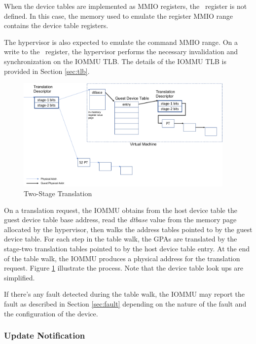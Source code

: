 When the device tables are implemented as MMIO registers, the \dtbase\ register is not
defined. In this case, the memory used to emulate the register MMIO range contains the
device table registers.

The hypervisor is also expected to emulate the command MMIO range. On a write to the
\invltlb\ register, the hypervisor performs the necessary invalidation and
synchronization on the IOMMU TLB. The details of the IOMMU TLB is provided in Section
\ref{sec:tlb}.

\begin{figure}[ht!]
    \centering
    \includegraphics[width=0.95\textwidth]{img/two-stage-trans.pdf}
    \caption{Two-Stage Translation}
    \label{fig:two-stage-trans}
\end{figure}

On a translation request, the IOMMU obtains from the host device table the guest device
table base address, read the \textit{dtbase} value from the memory page allocated by the
hypervisor, then walks the address tables pointed to by the guest device table. For each
step in the table walk, the GPAs are translated by the stage-two translation tables
pointed to by the host device table entry. At the end of the table walk, the IOMMU
produces a physical address for the translation request. Figure \ref{fig:two-stage-trans}
illustrate the process. Note that the device table look ups are simplified. 

If there's any fault detected during the table walk, the IOMMU may report the fault as
described in Section \ref{sec:fault} depending on the nature of the fault and the
configuration of the device.


\subsubsection{Update Notification}


